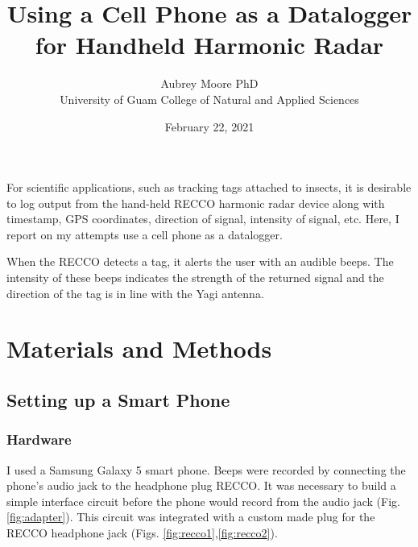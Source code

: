 \documentclass[12pt,letterpaper,english,bibliography=totocnumbered, abstract=on]{scrartcl}
\begin{document}
\titlehead{Technical Report}

\title{Using a Cell Phone as a Datalogger for Handheld Harmonic Radar}

\author{Aubrey Moore PhD\\University of Guam College of Natural and Applied Sciences}

\date{February 22, 2021}

\maketitle


\clearpage

For scientific applications, such as tracking tags attached to insects, it is desirable to log output from the hand-held RECCO harmonic radar device along with timestamp, GPS coordinates, direction of signal, intensity of signal, etc. Here, I report on my attempts use a cell phone as a datalogger.

When the RECCO detects a tag, it alerts the user with an audible beeps. The intensity of these beeps indicates the strength of the returned signal and the direction of the tag is in line with the Yagi antenna.

\section{Materials and Methods}

\subsection{Setting up a Smart Phone}


\subsubsection{Hardware}

I used a Samsung Galaxy 5 smart phone. Beeps were recorded by connecting the phone's audio jack to the headphone plug RECCO. It was necessary to build a simple interface circuit before the phone would record from the audio jack (Fig. \ref{fig:adapter}). This circuit was integrated with a custom made plug for the RECCO headphone jack (Figs. \ref{fig:recco1},\ref{fig:recco2}).
\end{document}
